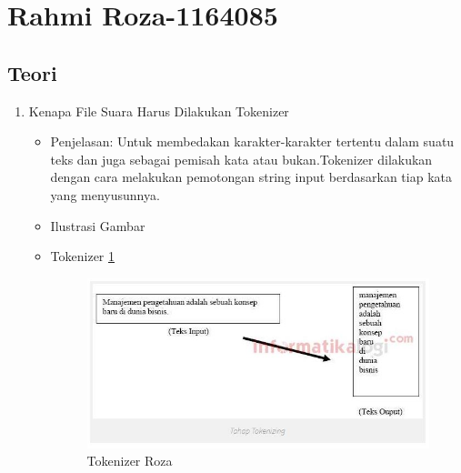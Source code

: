 \section{Rahmi Roza-1164085}
\subsection{Teori}
\begin{enumerate}
\item Kenapa File Suara Harus Dilakukan Tokenizer
\begin{itemize}
\item Penjelasan: Untuk membedakan karakter-karakter tertentu dalam suatu teks dan juga sebagai pemisah kata atau bukan.Tokenizer dilakukan dengan cara melakukan pemotongan string input berdasarkan tiap kata yang menyusunnya.
\par 
\par
\item Ilustrasi Gambar
\item Tokenizer \ref{teori1}
\begin{figure}[!hbtp]
\centering
\includegraphics[scale=0.7]{figures/teori1.jpg}
\caption{Tokenizer Roza}
\label{teori1}
\end{figure}
\par
\end{itemize}
\par
\par


\end{enumerate}
